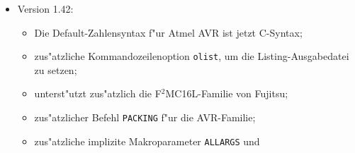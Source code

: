 \documentclass[12pt,a4paper,twoside]{report}
\newcommand{\tty}[1]{{\tt #1}}
\begin{document}
{\begin{itemize}
{\begin{itemize}
      \item{Key-Files k"onnen jetzt auch von der Kommandozeile aus
            referenziert werden (r8);}
      \item{zus"atzliche Kommandozeilenoption {\tt shareout}, um die 
            Ausgabedatei f"ur SHARED-Definitionen zu setzen (r8);}
      \item{neuer Pseudobefehl {\tt WRAPMODE}, um AVR-Prozessoren mit 
            verk"urztem Programmz"ahler zu unterst"utzen (r8);}
      \item{unterst"utzt zus"atzlich die C20x-Befehlsuntermenge im
            C5x-Teil (r8);}
      \item{hexadezimale Adre"angaben der Hilfsprogamme k"onnen jetzt
            auch in C-Notation gemacht werden (r8);}
      \item{Das Zahlensystem f"ur Integerergebnisse in \verb!\{...}!-
            Ausdr"ucken ist jetzt per \tty{OUTRADIX} setzbar (r8);}
      \item{Die Registersyntax f"ur 4004-Registerpaare wurde korrigiert
            (r8);}
      \item{unterst"utzt zus"atzlich die F$^{2}$MC8L-Familie von Fujitsu
            (r8);}
      \item{f"ur P2HEX kann jetzt die Minimall"ange f"ur S-Record-Adressen
            angegeben werden (r8);}
      \item{unterst"utzt zus"atzlich die ACE-Familie von Fairchild (r8);}
      \item{{\tt REG} ist jetzt auch f"ur PowerPCs erlaubt (r8);}
      \item{zus"atzlicher Schalter in P2HEX, um alle Adressen zu
            verschieben (r8);}
      \item{Mit dem Schalter \tty{x} kann man jetzt zus"atzlich in einer
            zweiten Stufe bie betroffene Quellzeile ausgeben (r8).}
      \end{itemize}}
\item{Version 1.42:
      \begin{itemize}
      \item{Die Default-Zahlensyntax f"ur Atmel AVR ist jetzt C-Syntax;}
      \item{zus"atzliche Kommandozeilenoption {\tt olist}, um die 
            Listing-Ausgabedatei zu setzen;}
      \item{unterst"utzt zus"atzlich die F$^{2}$MC16L-Familie von Fujitsu;}
      \item{zus"atzlicher Befehl {\tt PACKING} f"ur die AVR-Familie;}
      \item{zus"atzliche implizite Makroparameter {\tt ALLARGS} und
}
\end{itemize}}
\end{itemize}}
\end{document}
